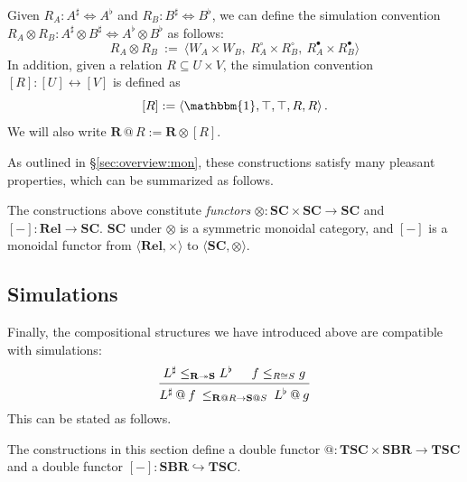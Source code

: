 \documentclass[acmsmall,screen,review,anonymous]{acmart}
\newcommand{\que}{\circ}
\newcommand{\ans}{\bullet}
\begin{document}
\begin{definition} \label{def:sctens}
Given $R_A : A^\sharp \Leftrightarrow A^\flat$
and $R_B : B^\sharp \Leftrightarrow B^\flat$,
we can define the simulation convention
$R_A \otimes R_B : A^\sharp \otimes B^\sharp
  \Leftrightarrow
  A^\flat \otimes B^\flat$
as follows:
\[
  R_A \otimes R_B \: := \:
    \big\langle
      W_A \times W_B, \:
      R_A^\que \times R_B^\que, \:
      R_A^\ans \times R_B^\ans
    \big\rangle
\]
In addition,
given a relation $R \subseteq U \times V$,
the simulation convention $[R] : [U] \leftrightarrow [V]$
is defined as
\[
  [R] := \langle \mathbbm{1}, \top, \top, R, R \rangle
  \,.
\]
We will also write $\mathbf{R} \mathbin@ R := \mathbf{R} \otimes [R]$.
\end{definition}

As outlined in \S\ref{sec:overview:mon},
these constructions satisfy many pleasant properties,
which can be summarized as follows.

\begin{theorem}
The constructions above constitute \emph{functors}
${\otimes} : \mathbf{SC} \times \mathbf{SC} \rightarrow \mathbf{SC}$
and
$[-] : \mathbf{Rel} \rightarrow \mathbf{SC}$.
$\mathbf{SC}$ under $\otimes$ is a symmetric monoidal category,
and $[-]$ is a monoidal functor
from $\langle \mathbf{Rel}, {\times} \rangle$ to
$\langle \mathbf{SC}, {\otimes} \rangle$.
\end{theorem}


\subsection{Simulations} \label{sec:scomp:sim} %

Finally,
the compositional structures we have introduced above
are compatible with simulations:
\[
  \begin{prooftree}
    \hypo{L^\sharp \le_{\mathbf{R} \twoheadrightarrow \mathbf{S}} L^\flat}
    \hypo{f \le_{R \cong S} g}
    \infer2{
      L^\sharp \mathbin@ f
      \:\le_{\mathbf{R}\mathbin@R \rightarrow \mathbf{S}\mathbin@S}\:
      L^\flat \mathbin@ g
    }
  \end{prooftree}
\]
This can be stated as follows.

\begin{theorem}
The constructions in this section
define a double functor
${@} : \mathbf{TSC} \times \mathbf{SBR} \rightarrow \mathbf{TSC}$
and a double functor
$[-] : \mathbf{SBR} \hookrightarrow \mathbf{TSC}$.
\end{theorem}
\end{document}
